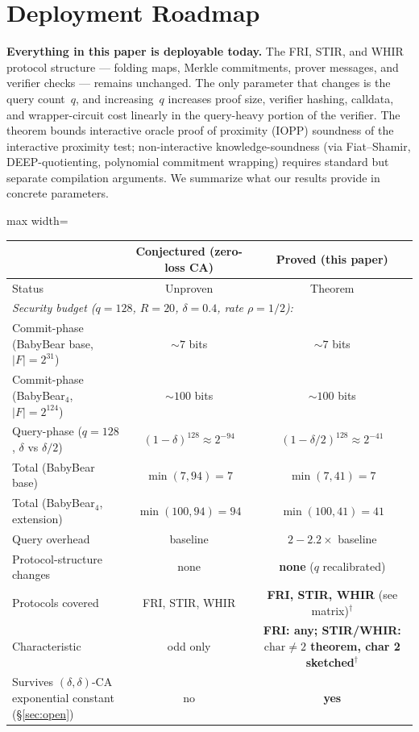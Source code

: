 \documentclass[11pt]{article}
\begin{document}
\section{Deployment Roadmap}
\label{sec:impact}

\textbf{Everything in this paper is deployable today.} The FRI, STIR, and WHIR protocol structure --- folding maps, Merkle commitments, prover messages, and verifier checks --- remains unchanged. The only parameter that changes is the query count~$q$, and increasing~$q$ increases proof size, verifier hashing, calldata, and wrapper-circuit cost linearly in the query-heavy portion of the verifier. The theorem bounds interactive oracle proof of proximity (IOPP) soundness of the interactive proximity test; non-interactive knowledge-soundness (via Fiat--Shamir, DEEP-quotienting, polynomial commitment wrapping) requires standard but separate compilation arguments. We summarize what our results provide in concrete parameters.

\begin{center}
\begin{adjustbox}{max width=\textwidth}
\small
\begin{tabular}{lcc}
\toprule
& Conjectured (zero-loss CA) & \textbf{Proved (this paper)} \\
\midrule
Status & Unproven & Theorem \\
\multicolumn{3}{l}{\textit{Security budget ($q = 128$, $R = 20$, $\delta = 0.4$, rate $\rho = 1/2$):}} \\
\quad Commit-phase (BabyBear base, $|F|=2^{31}$) & ${\sim}7$ bits & ${\sim}7$ bits \\
\quad Commit-phase (BabyBear$_4$, $|F|=2^{124}$) & ${\sim}100$ bits & ${\sim}100$ bits \\
\quad Query-phase ($q=128$, $\delta$ vs $\delta/2$) & $(1{-}\delta)^{128} \approx 2^{-94}$ & $(1{-}\delta/2)^{128} \approx 2^{-41}$ \\
\quad Total (BabyBear base) & $\min(7,94) = 7$ & $\min(7,41) = 7$ \\
\quad Total (BabyBear$_4$, extension) & $\min(100,94) = 94$ & $\min(100,41) = 41$ \\
Query overhead & baseline & $2{-}2.2\times$ baseline \\
Protocol-structure changes & none & \textbf{none} ($q$ recalibrated) \\
Protocols covered & FRI, STIR, WHIR & \textbf{FRI, STIR, WHIR} (see matrix)$^\dagger$ \\
Characteristic & odd only & \textbf{FRI: any; STIR/WHIR: $\mathrm{char}\neq 2$ theorem, char 2 sketched}$^\dagger$ \\
Survives $(\delta,\delta)$-CA exponential constant (\S\ref{sec:open}) & no & \textbf{yes} \\
\bottomrule
\end{tabular}
\end{adjustbox}
\end{center}
\end{document}
